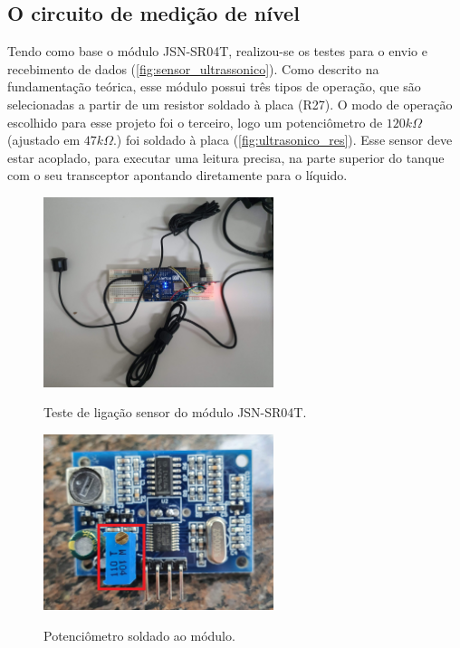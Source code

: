\subsection{O circuito de medição de nível}

Tendo como base o módulo JSN-SR04T, realizou-se os testes para o envio e recebimento de dados (\autoref{fig:sensor_ultrassonico}). Como descrito na fundamentação teórica, esse módulo possui três tipos de operação, que são selecionadas a partir de um resistor soldado à placa (R27). O modo de operação escolhido para esse projeto foi o terceiro, logo um potenciômetro de $120k\Omega$ (ajustado em $47k\Omega$.) foi soldado à placa (\autoref{fig:ultrasonico_res}). Esse sensor deve estar acoplado, para executar uma leitura precisa, na parte superior do tanque com o seu transceptor apontando diretamente para o líquido. 

 \begin{figure}[H]
	\centering
	\caption{Teste de ligação sensor do módulo JSN-SR04T.}
	\includegraphics[width=0.6\textwidth]{figuras/teste_ultrassonico.jpg}
	\label{fig:sensor_ultrassonico}
\end{figure}

 \begin{figure}[H]
	\centering
	\caption{Potenciômetro soldado ao módulo.}
	\includegraphics[width=0.6\textwidth]{figuras/ultrassonico_res.jpg}
	\label{fig:ultrasonico_res}
\end{figure}

